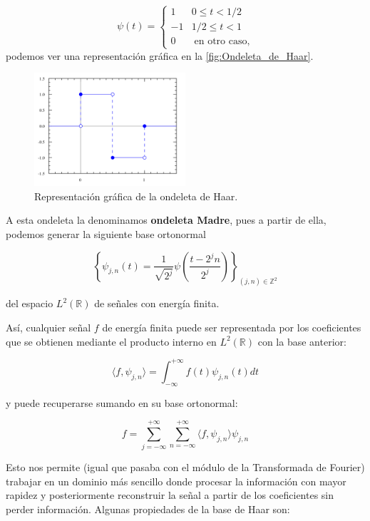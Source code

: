 $$ \psi(t)= \begin{cases} 
      1 & 0\leq t < 1/2 \\
      -1 & 1/2\leq t < 1 \\
      0 & \; \text{en otro caso},
   \end{cases}$$
\noindent podemos ver una representación gráfica en la \autoref{fig:Ondeleta_de_Haar}.
\begin{figure}[!h]
  \centering
  \includegraphics[width=0.5\textwidth]{img/Haar_wavelet.png}
  \caption{Representación gráfica de la ondeleta de Haar.}
  \label{fig:Ondeleta_de_Haar}
\end{figure}

\noindent A esta ondeleta la denominamos \textbf{ondeleta Madre}, pues a partir de ella, podemos generar la siguiente base ortonormal

\medskip

$$\left \lbrace \psi_{j,n}(t)= \frac{1}{\sqrt{2^j}} \psi\left(\frac{t-2^jn}{2^j}\right) \right\rbrace_{(j,n) \in \mathbb{Z}^2}$$

\noindent del espacio $L^2(\mathbb{R})$ de señales con energía finita.

\noindent Así, cualquier señal $f$ de energía finita puede ser representada por los coeficientes que se obtienen mediante el producto interno en $L^2(\mathbb{R})$ con la base anterior: 

$$\langle f,\psi_{j,n} \rangle =\int_{-\infty}^{+\infty} f(t) \psi_{j,n} (t) dt  $$

\noindent y puede recuperarse sumando en su base ortonormal:

$$f=\sum_{j=-\infty}^{+\infty}\sum_{n=-\infty}^{+\infty}  \langle f,\psi_{j,n} \rangle \psi_{j,n} $$

\noindent Esto nos permite (igual que pasaba con el módulo de la Transformada de Fourier) trabajar en un dominio más sencillo donde procesar la información con mayor rapidez y posteriormente reconstruir la señal a partir de los coeficientes sin perder información. Algunas propiedades de la base de Haar son: 

